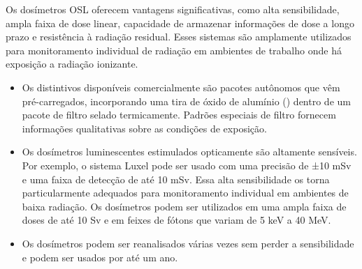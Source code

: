\documentclass[11pt,a4paper]{article}
\newcounter{exemplo}
\begin{document}
	Os dosímetros OSL oferecem vantagens significativas, como alta sensibilidade, ampla faixa de dose linear, capacidade de armazenar informações de dose a longo prazo e resistência à radiação residual. Esses sistemas são amplamente utilizados para monitoramento individual de radiação em ambientes de trabalho onde há exposição a radiação ionizante.


	\begin{exemplo}
		\begin{itemize}
			\item Os distintivos disponíveis comercialmente são pacotes autônomos que vêm pré-carregados, incorporando uma tira de óxido de alumínio () dentro de um pacote de filtro selado termicamente. Padrões especiais de filtro fornecem informações qualitativas sobre as condições de exposição.
			\item Os dosímetros luminescentes estimulados opticamente são altamente sensíveis. Por exemplo, o sistema Luxel pode ser usado com uma precisão de ±10 mSv e uma faixa de detecção de até 10 mSv. Essa alta sensibilidade os torna particularmente adequados para monitoramento individual em ambientes de baixa radiação. Os dosímetros podem ser utilizados em uma ampla faixa de doses de até 10 Sv e em feixes de fótons que variam de 5 keV a 40 MeV.
			\item Os dosímetros podem ser reanalisados várias vezes sem perder a sensibilidade e podem ser usados por até um ano.
		\end{itemize}
	\end{exemplo}


\end{document}
